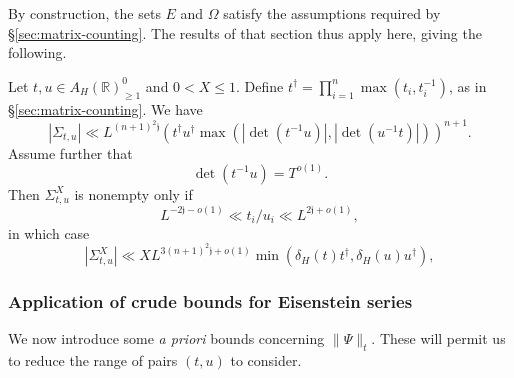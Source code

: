 By construction, the sets $E$ and $\Omega$ satisfy the assumptions required by \S\ref{sec:matrix-counting}.  The results of that section thus apply here, giving the following.

\begin{lemma}\label{lem:standard2:cool-counts-for-SIgma-t-u}
  Let $t, u \in A_H(\mathbb{R})^0_{\geq 1}$ and $0 < X \leq 1$.  Define $t^\dagger = \prod_{i=1}^n \max(t_i, t_i^{-1})$, as in \S\ref{sec:matrix-counting}.  We have
  \begin{equation}\label{eq:sigma-ll-ln+12-a-priori}
    |\Sigma_{t,u}| \ll
    L^{(n+1)^2 \mathfrak{j}}
    \left( t^\dagger u^\dagger \max(|\det(t^{-1} u)|, |\det(u^{-1} t)|) \right)^{n+1}.
  \end{equation}
  Assume further that
  \begin{equation}\label{eq:dett-1-u-b}
    \det(t^{-1} u) = T^{o(1)}.
  \end{equation}
  Then $\Sigma_{t,u}^X$ is nonempty only if
  \begin{equation}\label{eq:d--frac2n+1}
    L^{-2 \mathfrak{j}  - o(1)} \ll t_i / u_i \ll L^{2 \mathfrak{j} +o(1)},
  \end{equation}
  in which case
  \begin{equation}\label{eq:sigma_r-sx-ll}
    |\Sigma_{t,u}^X| \ll X L^{3(n+1)^2 \mathfrak{j} + o(1)} \min(\delta_H(t) t^\dagger, \delta_H(u) u^\dagger),
  \end{equation}
\end{lemma}

\subsubsection{Application of crude bounds for Eisenstein series}\label{sec:appl-crude-bounds}
We now introduce some \emph{a priori} bounds concerning $\|\Psi\|_t$.  These will permit us to reduce the range of pairs $(t,u)$ to consider.


